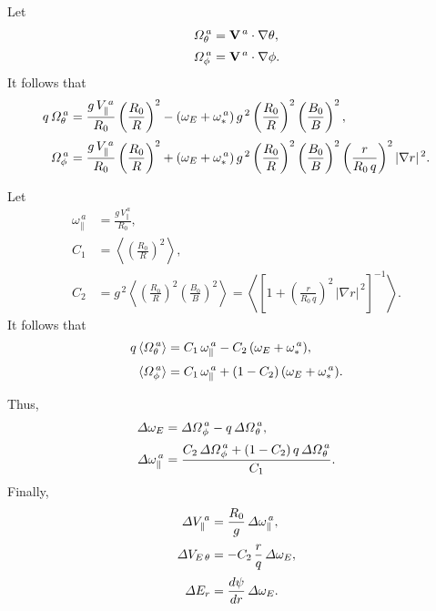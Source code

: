 \documentclass[12pt]{article}
\begin{document}
Let
\begin{align}
{\mit\Omega}_\theta^{\,a} &= {\bf V}^{\,a}\cdot\nabla\theta,\\[0.5ex]
{\mit\Omega}_\phi^{\,a} &= {\bf V}^{\,a}\cdot\nabla\phi.
\end{align}
It follows that
\begin{align}
q\,{\mit\Omega}_\theta^{\,a}& = \frac{g\,V_\parallel^{\,a}}{R_0}\left(\frac{R_0}{R}\right)^2- (\omega_E+\omega_{\ast}^{\,a})\,g^{\,2}
\left(\frac{R_0}{R}\right)^2\left(\frac{B_0}{B}\right)^2,\\[0.5ex]
{\mit\Omega}_\phi^{\,a}& = \frac{g\,V_\parallel^{\,a}}{R_0}\left(\frac{R_0}{R}\right)^2+ (\omega_E+\omega_{\ast}^{\,a})\,g^{\,2}
\left(\frac{R_0}{R}\right)^2\left(\frac{B_0}{B}\right)^2\left(\frac{r}{R_0\,q}\right)^2|\nabla r|^{\,2}.
\end{align}

Let 
\begin{align}
\omega_{\parallel}^{\,a} &= \frac{g\,V_\parallel^{\,a}}{R_0},\\[0.5ex]
C_1 &= \left\langle \left(\frac{R_0}{R}\right)^2\right\rangle,\\[0.5ex]
C_2 &= g^{\,2} \left\langle \left(\frac{R_0}{R}\right)^2\left(\frac{B_0}{B}\right)^2\right\rangle=\left\langle
\left[1+\left(\frac{r}{R_0\,q}\right)^2\,|\nabla r|^{\,2}\right]^{-1}\right\rangle.
\end{align}
It follows that
\begin{align}
q\,\langle{\mit\Omega}_\theta^{\,a}\rangle &= C_1\,\omega_\parallel^{\,a}- C_2\,(\omega_E+\omega_\ast^{\,a}),\\[0.5ex]
\langle{\mit\Omega}_\phi^{\,a}\rangle &= C_1\,\omega_\parallel^{\,a} +(1- C_2)\,(\omega_E+\omega_\ast^{\,a}).
\end{align}

Thus,
\begin{align}
{\mit\Delta}\omega_E &= {\mit\Delta\Omega}_\phi^{\,a}-q\,{\mit\Delta\Omega}_\theta^{\,a},\\[0.5ex]
{\mit\Delta}\omega_\parallel^{\,a} &= \frac{C_2\,{\mit\Delta\Omega}_\phi^{\,a} + (1-C_2)\,q\,{\mit\Delta\Omega}_\theta^{\,a}}{C_1}.
\end{align}
Finally,
\begin{align}
{\mit\Delta}V_{\parallel}^{\,a} &=\frac{R_0}{g}\,{\mit\Delta}\omega_\parallel^{\,a},\\[0.5ex]
{\mit\Delta}V_{E\,\theta} &= - C_2\,\frac{r}{q}\,{\mit\Delta}\omega_E,\\[0.5ex]
{\mit\Delta}E_r &= \frac{d\psi}{dr}\,{\mit\Delta}\omega_E.
\end{align}
\end{document}
